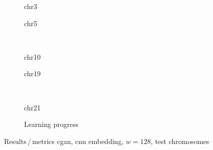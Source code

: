 \begin{figure}[p] %
    \begin{subfigure}{0.45\textwidth}
        \scriptsize
        \caption{chr3}
    \end{subfigure} \hfill
    \begin{subfigure}{0.45\textwidth}
        \scriptsize
        \caption{chr5}
    \end{subfigure}\\[5mm]
    \begin{subfigure}{0.45\textwidth}
        \scriptsize
        \caption{chr10}
    \end{subfigure}\hfill
    \begin{subfigure}{0.45\textwidth}
        \scriptsize
        \caption{chr19}
    \end{subfigure}\\[3mm]
    \centering
    \begin{subfigure}{0.45\textwidth}
        \scriptsize
        \caption{chr21}
    \end{subfigure} \hfill
    \begin{subfigure}{0.45\textwidth}
        \scriptsize
        \caption{Learning progress} \label{fig:results:cGAN128_lossEpochs}
    \end{subfigure}
    \caption{Results\,/\,metrics \acrshort{cgan}, \acrshort{cnn} embedding, $w=128$, test chromosomes}   \label{fig:results:cGAN128_pearson}
\end{figure}
